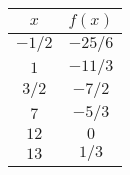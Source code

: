 \begin{tabular}{cc} \toprule
$x$      & $f(x)$    \\\midrule
$-1 / 2$ & $-25 / 6$ \\
$1$      & $-11 / 3$ \\
$3 / 2$  & $-7 / 2$  \\
$7$      & $-5 / 3$  \\
$12$     & $0$       \\
$13$     & $1 / 3$   \\\bottomrule
\end{tabular}

